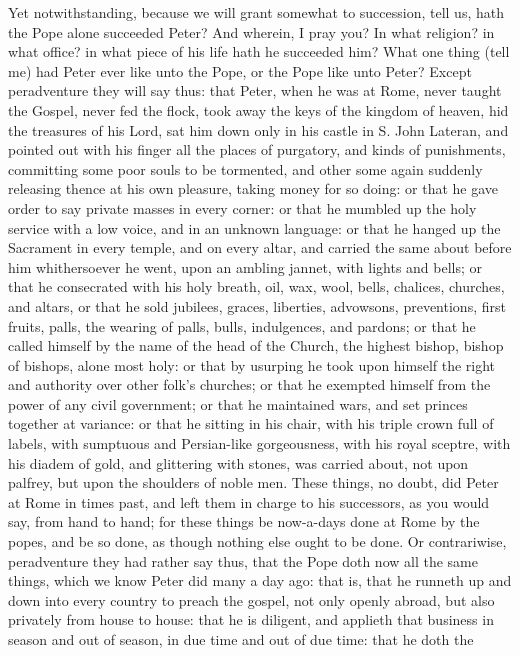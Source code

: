 Yet notwithstanding, because we will grant somewhat to succession,
tell us, hath the Pope alone succeeded Peter? And wherein, I pray
you? In what religion? in what office? in what piece of his life
hath he succeeded him? What one thing (tell me) had Peter ever
like unto the Pope, or the Pope like unto Peter? Except peradventure
they will say thus: that Peter, when he was at Rome, never taught the
Gospel, never fed the flock, took away the keys of the kingdom of heaven,
hid the treasures of his Lord, sat him down only in his castle in S.
John Lateran, and pointed out with his finger all the places of purgatory,
and kinds of punishments, committing some poor souls to be tormented,
and other some again suddenly releasing thence at his own pleasure,
taking money for so doing: or that he gave order to say private masses
in every corner: or that he mumbled up the holy service with a low voice,
and in an unknown language: or that he hanged up the Sacrament in every
temple, and on every altar, and carried the same about before him whithersoever
he went, upon an ambling jannet, with lights and bells; or that he consecrated
with his holy breath, oil, wax, wool, bells, chalices, churches, and
altars, or that he sold jubilees, graces, liberties, advowsons, preventions,
first fruits, palls, the wearing of palls, bulls, indulgences, and pardons;
or that he called himself by the name of the head of the Church, the
highest bishop, bishop of bishops, alone most holy: or that by usurping
he took upon himself the right and authority over other folk’s
churches; or that he exempted himself from the power of any civil government;
or that he maintained wars, and set princes together at variance: or
that he sitting in his chair, with his triple crown full of labels,
with sumptuous and Persian-like gorgeousness, with his royal sceptre,
with his diadem of gold, and glittering with stones, was carried about,
not upon palfrey, but upon the shoulders of noble men. These things,
no doubt, did Peter at Rome in times past, and left them in charge to
his successors, as you would say, from hand to hand; for these things
be now-a-days done at Rome by the popes, and be so done, as though nothing
else ought to be done. Or contrariwise, peradventure they had
rather say thus,
that the Pope doth now all the same things, which we know Peter did
many a day ago: that is, that he runneth up and down into every country
to preach the gospel, not only openly abroad, but also privately from
house to house: that he is diligent, and applieth that business in season
and out of season, in due time and out of due time: that he doth the
